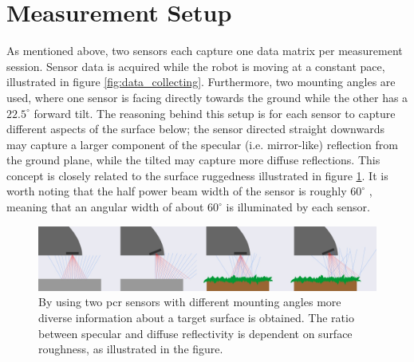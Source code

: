 \section{Measurement Setup}\label{sec:setup}
As mentioned above, two sensors each capture one data matrix per measurement session. Sensor data is acquired while the robot is moving at a constant pace, illustrated in figure \ref{fig:data_collecting}. Furthermore, two mounting angles are used, where one sensor is facing directly towards the ground while the other has a $22.5^\circ$ forward tilt. The reasoning behind this setup is for each sensor to capture different aspects of the surface below; the sensor directed straight downwards may capture a larger component of the specular (i.e. mirror-like) reflection from the ground plane, while the tilted may capture more diffuse reflections. This concept is closely related to the surface ruggedness illustrated in figure \ref{fig:reflections}. It is worth noting that the half power beam width of the sensor is roughly $60^\circ$ \citep{acconeer_datasheet_a111}, meaning that an angular width of about $60^\circ$ is illuminated by each sensor.

\begin{figure}[h]
	\centering
	\includegraphics[scale=0.2]{figs_temp/reflections.jpg}
	\caption{By using two \gls{pcr} sensors with different mounting angles more diverse information about a target surface is obtained. The ratio between specular and diffuse reflectivity is dependent on surface roughness, as illustrated in the figure.}
	\label{fig:reflections}
\end{figure}

